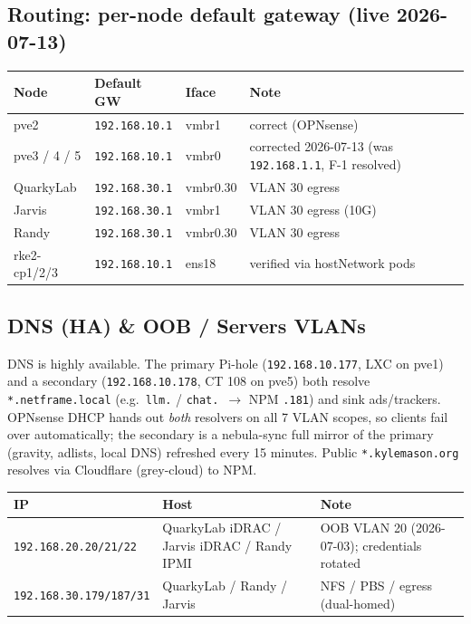\documentclass[11pt,letterpaper]{article}
\newcommand{\ip}[1]{\texttt{#1}}
\begin{document}
\subsection{Routing: per-node default gateway (live 2026-07-13)}
\begin{center}\footnotesize
\begin{tabularx}{\textwidth}{@{}l l l X@{}}
\toprule Node & Default GW & Iface & Note \\ \midrule
pve2 & \ip{192.168.10.1} & vmbr1 & correct (OPNsense) \\
pve3 / 4 / 5 & \ip{192.168.10.1} & vmbr0 & corrected 2026-07-13 (was \ip{192.168.1.1}, F-1 resolved) \\
QuarkyLab & \ip{192.168.30.1} & vmbr0.30 & VLAN 30 egress \\
Jarvis & \ip{192.168.30.1} & vmbr1 & VLAN 30 egress (10G) \\
Randy & \ip{192.168.30.1} & vmbr0.30 & VLAN 30 egress \\
rke2-cp1/2/3 & \ip{192.168.10.1} & ens18 & verified via hostNetwork pods \\
\bottomrule
\end{tabularx}
\end{center}

\subsection{DNS (HA) \& OOB / Servers VLANs}
DNS is highly available. The primary Pi-hole (\ip{192.168.10.177}, LXC on pve1) and a secondary (\ip{192.168.10.178}, CT 108 on pve5) both resolve \texttt{*.netframe.local} (e.g.\ \texttt{llm.} / \texttt{chat.}\ $\rightarrow$ NPM \ip{.181}) and sink ads/trackers. OPNsense DHCP hands out \emph{both} resolvers on all 7 VLAN scopes, so clients fail over automatically; the secondary is a nebula-sync full mirror of the primary (gravity, adlists, local DNS) refreshed every 15 minutes. Public \texttt{*.kylemason.org} resolves via Cloudflare (grey-cloud) to NPM.
\begin{center}\footnotesize
\begin{tabularx}{\textwidth}{@{}l l X@{}}
\toprule IP & Host & Note \\ \midrule
\ip{192.168.20.20/21/22} & QuarkyLab iDRAC / Jarvis iDRAC / Randy IPMI & OOB VLAN 20 (2026-07-03); credentials rotated \\
\ip{192.168.30.179/187/31} & QuarkyLab / Randy / Jarvis & NFS / PBS / egress (dual-homed) \\
\bottomrule
\end{tabularx}
\end{center}
\end{document}
